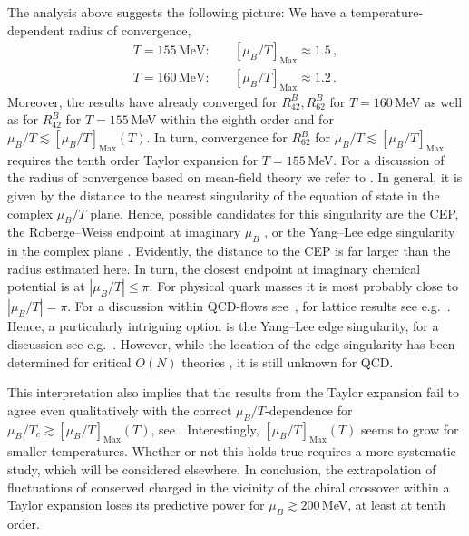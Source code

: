 \documentclass[%
reprint,
superscriptaddress,
showpacs,preprintnumbers,
amsmath,amssymb,
aps,
prd,
]{revtex4-1}
\def\fig#1{\Cref{#1}}
\begin{document}
The analysis above suggests the following picture: We have a temperature-dependent radius of convergence, 
%
\begin{align}\nonumber 
 T=155\,\textrm{MeV}:\quad &[\mu_B/T]_\textrm{Max}\approx 1.5\,,\\[1ex] T=160\,\textrm{MeV}:\quad &[\mu_B/T]_\textrm{Max}\approx 1.2\,.
\label{eq:RadiusConverge}\end{align}
%
Moreover, the results have already converged for $R_{42}^B,R_{62}^B$ for $T=160$\,MeV as well as for $R^B_{42}$ for $T=155$\,MeV within the eighth order and for $\mu_B/T\lesssim [\mu_B/T]_\textrm{Max}(T)$. In turn, convergence for $R^B_{62}$ for $\mu_B/T\lesssim  [\mu_B/T]_\textrm{Max}$ requires the tenth order Taylor expansion for $T=155$\,MeV. For a discussion of the radius of convergence based on mean-field theory we refer to \cite{Karsch:2010hm}. In general, it is given by the distance to the nearest singularity of the equation of state in the complex $\mu_B/T$ plane. Hence, possible candidates for this singularity are the CEP, the Roberge--Weiss endpoint at imaginary $\mu_B$ \cite{Roberge:1986mm}, or the Yang--Lee edge singularity in the complex plane \cite{Yang:1952be}. Evidently, the distance to the CEP is far larger than the radius estimated here. In turn, the closest endpoint at imaginary chemical potential is at $|\mu_B/T|\leq \pi$. For physical quark masses it is most probably close to $|\mu_B/T|=\pi$. For a discussion within QCD-flows see~\cite{Braun:2009gm}, for lattice results see e.g.~\cite{Philipsen:2014rpa}. Hence, a particularly intriguing option is the Yang--Lee edge singularity, for a discussion see e.g.~\cite{Stephanov:2006dn, Mukherjee:2019eou}. However, while the location of the edge singularity has been determined for critical $O(N)$ theories \cite{Connelly:2020gwa}, it is still unknown for QCD.

This interpretation also implies that the results from the Taylor expansion fail to agree even qualitatively with the correct $\mu_B/T$-dependence for $\mu_B/T_c \gtrsim [\mu_B/T]_\textrm{Max}(T)$, see  \fig{fig:R42R62expansion-muBoT}. Interestingly, $[\mu_B/T]_\textrm{Max}(T)$ seems to grow for smaller temperatures. Whether or not this holds true requires a more systematic study, which will be considered elsewhere. In conclusion, the extrapolation of fluctuations of conserved charged in the vicinity of the chiral crossover within a Taylor expansion loses its predictive power for $\mu_B\gtrsim 200$\,MeV, at least at tenth order.  
\end{document}
